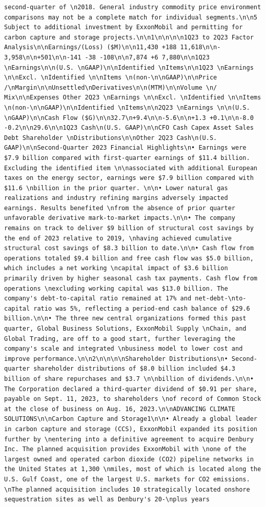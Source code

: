 \documentclass[
  letterpaper,
  DIV=11,
  numbers=noendperiod]{scrreprt}
\begin{document}
\begin{verbatim}
second-quarter of \n2018. General industry commodity price environment comparisons may not be a complete match for individual segments.\n\n5 Subject to additional investment by ExxonMobil and permitting for carbon capture and storage projects.\n\n1\n\n\n\n1Q23 to 2Q23 Factor Analysis\n\nEarnings/(Loss) ($M)\n\n11,430 +188 11,618\n\n-3,958\n\n+501\n\n-141 -38 -108\n\n7,874 +6 7,880\n\n1Q23 \nEarnings\n\n(U.S. \nGAAP)\n\nIdentified \nItems\n\n1Q23 \nEarnings \n\nExcl. \nIdentified \n\nItems \n(non-\n\nGAAP)\n\nPrice /\nMargin\n\nUnsettled\nDerivatives\n\n(MTM)\n\nVolume \n/ Mix\n\nExpenses Other 2Q23 \nEarnings \n\nExcl. \nIdentified \n\nItems \n(non-\n\nGAAP)\n\nIdentified \nItems\n\n2Q23 \nEarnings \n\n(U.S. \nGAAP)\n\nCash Flow ($G)\n\n32.7\n+9.4\n\n-5.6\n\n+1.3 +0.1\n\n-8.0 -0.2\n\n29.6\n\n1Q23 Cash\n(U.S. GAAP)\n\nCFO Cash Capex Asset Sales Debt Shareholder \nDistributions\n\nOther 2Q23 Cash\n(U.S. GAAP)\n\nSecond-Quarter 2023 Financial Highlights\n• Earnings were $7.9 billion compared with first-quarter earnings of $11.4 billion. Excluding the identified item \n\nassociated with additional European taxes on the energy sector, earnings were $7.9 billion compared with $11.6 \nbillion in the prior quarter. \n\n• Lower natural gas realizations and industry refining margins adversely impacted earnings. Results benefited \nfrom the absence of prior quarter unfavorable derivative mark-to-market impacts.\n\n• The company remains on track to deliver $9 billion of structural cost savings by the end of 2023 relative to 2019, \nhaving achieved cumulative structural cost savings of $8.3 billion to date.\n\n• Cash flow from operations totaled $9.4 billion and free cash flow was $5.0 billion, which includes a net working \ncapital impact of $3.6 billion primarily driven by higher seasonal cash tax payments. Cash flow from operations \nexcluding working capital was $13.0 billion. The company's debt-to-capital ratio remained at 17% and net-debt-\nto-capital ratio was 5%, reflecting a period-end cash balance of $29.6 billion.\n\n• The three new central organizations formed this past quarter, Global Business Solutions, ExxonMobil Supply \nChain, and Global Trading, are off to a good start, further leveraging the company's scale and integrated \nbusiness model to lower cost and improve performance.\n\n2\n\n\n\nShareholder Distributions\n• Second-quarter shareholder distributions of $8.0 billion included $4.3 billion of share repurchases and $3.7 \n\nbillion of dividends.\n\n• The Corporation declared a third-quarter dividend of $0.91 per share, payable on Sept. 11, 2023, to shareholders \nof record of Common Stock at the close of business on Aug. 16, 2023.\n\nADVANCING CLIMATE SOLUTIONS\n\nCarbon Capture and Storage1\n\n• Already a global leader in carbon capture and storage (CCS), ExxonMobil expanded its position further by \nentering into a definitive agreement to acquire Denbury Inc. The planned acquisition provides ExxonMobil with \none of the largest owned and operated carbon dioxide (CO2) pipeline networks in the United States at 1,300 \nmiles, most of which is located along the U.S. Gulf Coast, one of the largest U.S. markets for CO2 emissions. \nThe planned acquisition includes 10 strategically located onshore sequestration sites as well as Denbury's 20-\nplus years 
\end{verbatim}
\end{document}
